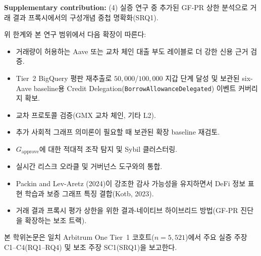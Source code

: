 \textbf{Supplementary contribution:} (4) 실증 연구 중 추가된 GF-PR 상한 분석으로 거래 결과 프록시에서의 구성개념 중첩 명확화(SRQ1).


위 한계와 본 연구 범위에서 다음 확장이 따른다:

\begin{itemize}
\item 거래량이 허용하는 Aave 또는 교차 체인 대출 부도 레이블로 더 강한 신용 근거 검증.
\item Tier~2 BigQuery 평판 재추출로 $50{,}000$/$100{,}000$ 지갑 단계 달성 및 보관된 six-Aave baseline용 Credit Delegation(\texttt{BorrowAllowanceDelegated}) 이벤트 커버리지 확보.
\item 교차 프로토콜 검증(GMX 교차 체인, 기타 L2).
\item 추가 사회적 그래프 의미론이 필요할 때 보관된 확장 baseline 재검토.
\item $G_{\text{approve}}$에 대한 적대적 조작 탐지 및 Sybil 클러스터링.
\item 실시간 리스크 오라클 및 거버넌스 도구와의 통합.
\item Packin and Lev-Aretz (2024)이 강조한 감사 가능성을 유지하면서 DeFi 정보 표현 학습과 보증 그래프 특징 결합(Kotb, 2023).
\item 거래 결과 프록시 평가 상한을 위한 결과-네이티브 하이브리드 방법(GF-PR 진단을 확장하는 보조 트랙).
\end{itemize}

본 학위논문은 일치 Arbitrum One Tier~1 코호트($n=5{,}521$)에서 주요 실증 주장 C1--C4(RQ1--RQ4) 및 보조 주장 SC1(SRQ1)을 보고한다.
